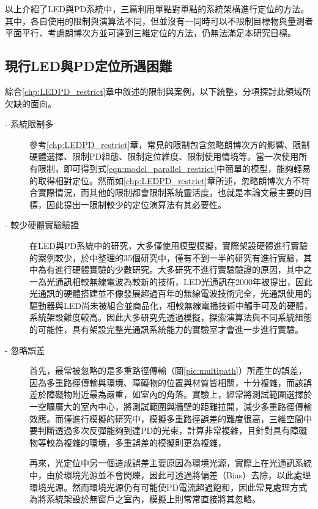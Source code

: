     以上介紹了LED與PD系統中，三篇利用單點對單點的系統架構進行定位的方法。其中，各自使用的限制與演算法不同，但並沒有一同時可以不限制目標物與量測者平面平行、考慮朗博次方並可達到三維定位的方法，仍無法滿足本研究目標。




\subsection{現行LED與PD定位所遇困難}
\label{chp:LEDPD_problem}
    
綜合\ref{chp:LEDPD_restrict}章中敘述的限制與案例，以下統整，分項探討此領域所欠缺的面向。

\begin{description}

    \item[- 系統限制多]\hfill 
    
    \qquad
    參考\ref{chp:LEDPD_restrict}章，常見的限制包含忽略朗博次方的影響、限制硬體選擇、限制PD組態、限制定位維度、限制使用情境等。當一次使用所有限制，即可得到式\ref{eqn:model_parallel_restrict}中簡單的模型，能夠輕易的取得相對定位。然而如\ref{chp:LEDPD_restrict}章所述，忽略朗博次方不符合實際情況，而其他的限制都會限制系統靈活度，也就是本論文最主要的目標，因此提出一限制較少的定位演算法有其必要性。
    
    \item[- 較少硬體實驗驗證]\hfill 
    
    \qquad
    在LED與PD系統中的研究，大多僅使用模型模擬，實際架設硬體進行實驗的案例較少，於\cite{survey_light2018}中整理的35個研究中，僅有不到一半的研究有進行實驗，其中\cite{case:hypercube}\cite{case:3d_layers}為有進行硬體實驗的少數研究。大多研究不進行實驗驗證的原因，其中之一為光通訊相較無線電波為較新的技術，LED光通訊在2000年被提出\cite{vlc}，因此光通訊的硬體搭建並不像發展超過百年的無線電波技術完全，光通訊使用的驅動器與LED尚未被組合並商品化\cite{vlc_adv}，相較無線電播技術中觸手可及的硬體，系統架設難度較高。因此大多研究先透過模擬，探索演算法與不同系統組態的可能性，具有架設完整光通訊系統能力的實驗室才會進一步進行實驗。


    \item[- 忽略誤差]\hfill 

    \qquad
    首先，最常被忽略的是多重路徑傳輸（圖\ref{pic:multipath}）所產生的誤差，因為多重路徑傳輸與環境、障礙物的位置與材質皆相關，十分複雜，而該誤差於障礙物附近最為嚴重，如室內的角落。實驗上，經常將測試範圍選擇於一空曠廣大的室內中心，將測試範圍與牆壁的距離拉開，減少多重路徑傳輸效應。而僅進行模擬的研究中，模擬多重路徑誤差的難度很高\cite{multipath}，三維空間中要判斷透過多次反彈能夠到達PD的光束，計算非常複雜，且針對具有障礙物等較為複雜的環境，多重誤差的模擬則更為複雜，

    再來，光定位中另一個造成誤差主要原因為環境光源，實際上在光通訊系統中，由於環境光源並不會閃爍，因此可透過將偏差（Bias）去除，以此處理環境光源。然而環境光源仍有可能使PD電流超過飽和，因此常見處理方式為將系統架設於無窗戶之室內，模擬上則常常直接將其忽略。

\end{description}






